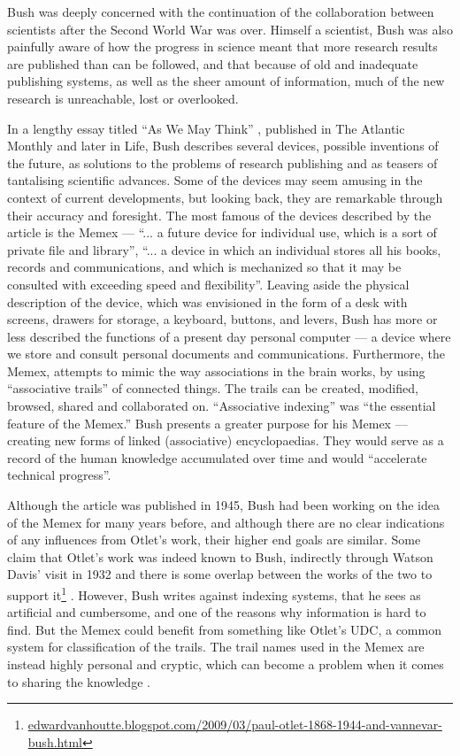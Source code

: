 Bush was deeply concerned with the continuation of the collaboration between scientists after the Second World War was over. Himself a scientist, Bush was also painfully aware of how the progress in science meant that more research results are published than can be followed, and that because of old and inadequate publishing systems, as well as the sheer amount of information, much of the new research is unreachable, lost or overlooked. 

In a lengthy essay titled ``As We May Think'' \cite{Bush1945}, published in The Atlantic Monthly and later in Life, Bush describes several devices, possible inventions of the future, as solutions to the problems of research publishing and as teasers of tantalising scientific advances. Some of the devices may seem amusing in the context of current developments, but looking back, they are remarkable through their accuracy and foresight. 
The most famous of the devices described by the article is the Memex --- ``... a future device for individual use, which is a sort of private file and library'', ``... a device in which an individual stores all his books, records and communications, and which is mechanized so that it may be consulted with exceeding speed and flexibility''. Leaving aside the physical description of the device, which was envisioned in the form of a desk with screens, drawers for storage, a keyboard, buttons, and levers, Bush has more or less described the functions of a present day personal computer --- a device where we store and consult personal documents and communications. Furthermore, the Memex, attempts to mimic the way associations in the brain works, by using ``associative trails'' of connected things. The trails can be created, modified, browsed, shared and collaborated on. ``Associative indexing'' was ``the essential feature of the Memex.'' 
Bush presents a greater purpose for his Memex --- creating new forms of linked (associative) encyclopaedias. They would serve as a record of the human knowledge accumulated over time and would ``accelerate technical progress''. 

Although the article was published in 1945, Bush had been working on the idea of the Memex for many years before, and although there are no clear indications of any influences from Otlet's work, their higher end goals are similar. 
Some claim that Otlet's work was indeed known to Bush, indirectly through Watson Davis' visit in 1932 and there is some overlap between the works of the two to support it\footnote{\url{edwardvanhoutte.blogspot.com/2009/03/paul-otlet-1868-1944-and-vannevar-bush.html}} \cite{Veith2006}.
However, Bush writes against indexing systems, that he sees as artificial and cumbersome, and one of the reasons why information is hard to find. But the Memex could benefit from something like Otlet's UDC, a common system for classification of the trails. The trail names used in the Memex are instead highly personal and cryptic, which can become a problem when it comes to sharing the knowledge \cite{Buckland1992}.

